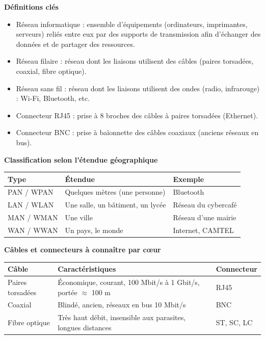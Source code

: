 \documentclass[11pt]{article}
\newcommand{\cle}[1]{{\popxbold\color{popdark}#1}}
\begin{document}
\begin{bilan}
\textbf{Définitions clés}
\begin{itemize}
  \item \cle{Réseau informatique} : ensemble d'équipements (ordinateurs, imprimantes, serveurs) reliés entre eux par des supports de transmission afin d'échanger des données et de partager des ressources.
  \item \cle{Réseau filaire} : réseau dont les liaisons utilisent des câbles (paires torsadées, coaxial, fibre optique).
  \item \cle{Réseau sans fil} : réseau dont les liaisons utilisent des ondes (radio, infrarouge) : Wi-Fi, Bluetooth, etc.
  \item \cle{Connecteur RJ45} : prise à 8 broches des câbles à paires torsadées (Ethernet).
  \item \cle{Connecteur BNC} : prise à baïonnette des câbles coaxiaux (anciens réseaux en bus).
\end{itemize}

\textbf{Classification selon l'étendue géographique}
\begin{center}
\begin{tabularx}{\linewidth}{|l|X|l|}
\hline
\rowcolor{popblueL} \textbf{Type} & \textbf{Étendue} & \textbf{Exemple} \\
\hline
PAN / WPAN & Quelques mètres (une personne) & Bluetooth \\
\hline
LAN / WLAN & Une salle, un bâtiment, un lycée & Réseau du cybercafé \\
\hline
MAN / WMAN & Une ville & Réseau d'une mairie \\
\hline
WAN / WWAN & Un pays, le monde & Internet, CAMTEL \\
\hline
\end{tabularx}
\end{center}

\textbf{Câbles et connecteurs à connaître par cœur}
\begin{center}
\begin{tabularx}{\linewidth}{|l|X|X|}
\hline
\rowcolor{popblueL} \textbf{Câble} & \textbf{Caractéristiques} & \textbf{Connecteur} \\
\hline
Paires torsadées & Économique, courant, 100 Mbit/s à 1 Gbit/s, portée $\approx$ 100 m & RJ45 \\
\hline
Coaxial & Blindé, ancien, réseaux en bus 10 Mbit/s & BNC \\
\hline
Fibre optique & Très haut débit, insensible aux parasites, longues distances & ST, SC, LC \\
\hline
\end{tabularx}
\end{center}


\end{bilan}
\end{document}

